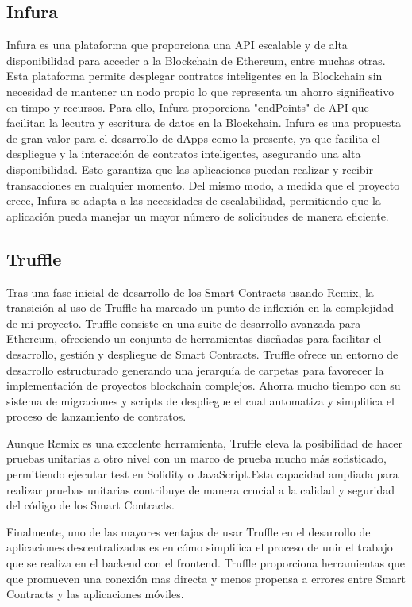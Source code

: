 \subsection{Infura}

Infura es una plataforma que proporciona una API escalable y de alta disponibilidad para acceder a la Blockchain de Ethereum, entre muchas otras.
Esta plataforma permite desplegar contratos inteligentes en la Blockchain sin necesidad de mantener un nodo propio lo que representa un ahorro significativo en timpo y recursos.
Para ello, Infura proporciona "endPoints" de API que facilitan la lecutra y escritura de datos en la Blockchain.
Infura es una propuesta de gran valor para el desarrollo de dApps como la presente, ya que facilita el despliegue y la interacción de contratos inteligentes, asegurando una alta disponibilidad. Esto garantiza que las aplicaciones puedan realizar y recibir transacciones en cualquier momento.
Del mismo modo, a medida que el proyecto crece, Infura se adapta a las necesidades de escalabilidad, permitiendo que la aplicación pueda manejar un mayor número de solicitudes de manera eficiente.


\subsection{Truffle}

Tras una fase inicial de desarrollo de los Smart Contracts usando Remix, la transición al uso de Truffle ha marcado un punto de inflexión en la complejidad de mi proyecto.
Truffle consiste en una suite de desarrollo avanzada para Ethereum, ofreciendo un conjunto de herramientas diseñadas para facilitar el desarrollo, gestión y despliegue de Smart Contracts.
Truffle ofrece un entorno de desarrollo estructurado generando una jerarquía de carpetas para favorecer la implementación de proyectos blockchain complejos.
Ahorra mucho tiempo con su sistema de migraciones y scripts de despliegue el cual automatiza y simplifica el proceso de lanzamiento de contratos.

Aunque Remix es una excelente herramienta, Truffle eleva la posibilidad de hacer pruebas unitarias a otro nivel con un marco de prueba mucho más sofisticado, permitiendo ejecutar test en Solidity o JavaScript.Esta capacidad ampliada para realizar pruebas unitarias contribuye de manera crucial a la calidad y seguridad del código de los Smart Contracts.

Finalmente, uno de las mayores ventajas de usar Truffle en el desarrollo de aplicaciones descentralizadas es en cómo simplifica el proceso de unir el trabajo que se realiza en el backend con el frontend. Truffle proporciona herramientas que que promueven una conexión mas directa y menos propensa a errores entre Smart Contracts y las aplicaciones móviles.


